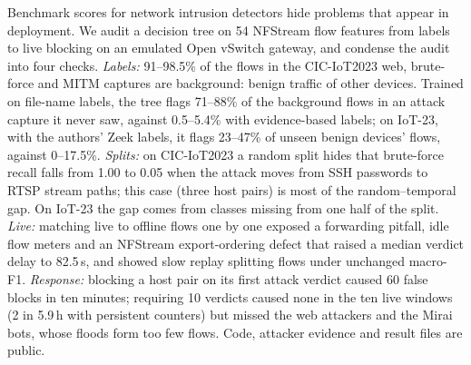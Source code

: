 Benchmark scores for network intrusion detectors hide problems that appear in deployment. We audit a decision tree on 54 NFStream flow features from labels to live blocking on an emulated Open vSwitch gateway, and condense the audit into four checks. \emph{Labels:} 91--98.5\% of the flows in the CIC-IoT2023 web, brute-force and MITM captures are background: benign traffic of other devices. Trained on file-name labels, the tree flags 71--88\% of the background flows in an attack capture it never saw, against 0.5--5.4\% with evidence-based labels; on IoT-23, with the authors' Zeek labels, it flags 23--47\% of unseen benign devices' flows, against 0--17.5\%. \emph{Splits:} on CIC-IoT2023 a random split hides that brute-force recall falls from 1.00 to 0.05 when the attack moves from SSH passwords to RTSP stream paths; this case (three host pairs) is most of the random--temporal gap. On IoT-23 the gap comes from classes missing from one half of the split. \emph{Live:} matching live to offline flows one by one exposed a forwarding pitfall, idle flow meters and an NFStream export-ordering defect that raised a median verdict delay to 82.5\,s, and showed slow replay splitting flows under unchanged macro-F1. \emph{Response:} blocking a host pair on its first attack verdict caused 60 false blocks in ten minutes; requiring 10 verdicts caused none in the ten live windows (2 in 5.9\,h with persistent counters) but missed the web attackers and the Mirai bots, whose floods form too few flows. Code, attacker evidence and result files are public.

